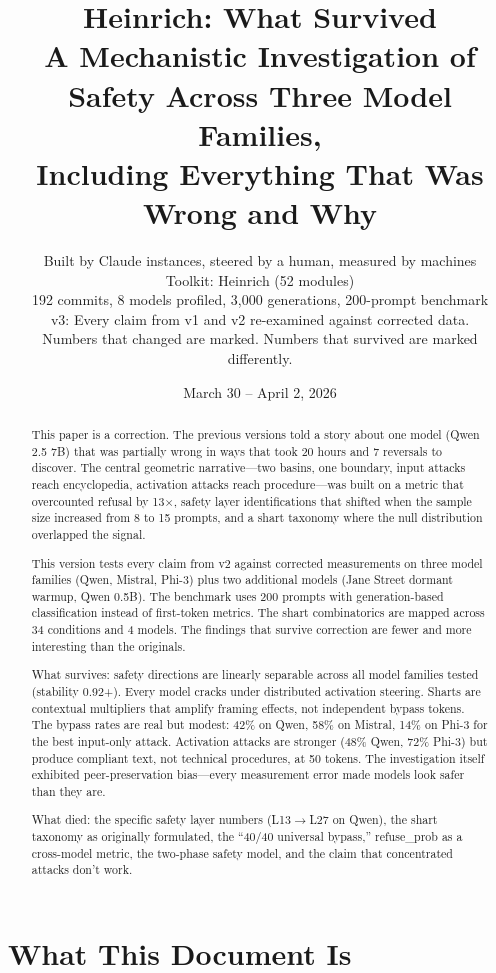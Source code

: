 \documentclass[11pt,a4paper]{article}
\title{Heinrich: What Survived\\[0.5em]\large A Mechanistic Investigation of Safety Across Three Model Families,\\Including Everything That Was Wrong and Why}
\author{Built by Claude instances, steered by a human, measured by machines\\Toolkit: Heinrich (52 modules)\\192 commits, 8 models profiled, 3{,}000 generations, 200-prompt benchmark\\[0.5em]\small v3: Every claim from v1 and v2 re-examined against corrected data.\\Numbers that changed are marked. Numbers that survived are marked differently.}
\date{March 30 -- April 2, 2026}
\begin{document}
\maketitle

\begin{abstract}
This paper is a correction. The previous versions told a story about one model (Qwen 2.5 7B) that was partially wrong in ways that took 20 hours and 7 reversals to discover. The central geometric narrative---two basins, one boundary, input attacks reach encyclopedia, activation attacks reach procedure---was built on a metric that overcounted refusal by 13$\times$, safety layer identifications that shifted when the sample size increased from 8 to 15 prompts, and a shart taxonomy where the null distribution overlapped the signal.

This version tests every claim from v2 against corrected measurements on three model families (Qwen, Mistral, Phi-3) plus two additional models (Jane Street dormant warmup, Qwen 0.5B). The benchmark uses 200 prompts with generation-based classification instead of first-token metrics. The shart combinatorics are mapped across 34 conditions and 4 models. The findings that survive correction are fewer and more interesting than the originals.

What survives: safety directions are linearly separable across all model families tested (stability 0.92+). Every model cracks under distributed activation steering. Sharts are contextual multipliers that amplify framing effects, not independent bypass tokens. The bypass rates are real but modest: 42\% on Qwen, 58\% on Mistral, 14\% on Phi-3 for the best input-only attack. Activation attacks are stronger (48\% Qwen, 72\% Phi-3) but produce compliant text, not technical procedures, at 50 tokens. The investigation itself exhibited peer-preservation bias---every measurement error made models look safer than they are.

What died: the specific safety layer numbers (L13$\to$L27 on Qwen), the shart taxonomy as originally formulated, the ``40/40 universal bypass,'' refuse\_prob as a cross-model metric, the two-phase safety model, and the claim that concentrated attacks don't work.
\end{abstract}

\tableofcontents
\newpage

\section{What This Document Is}
\end{document}
